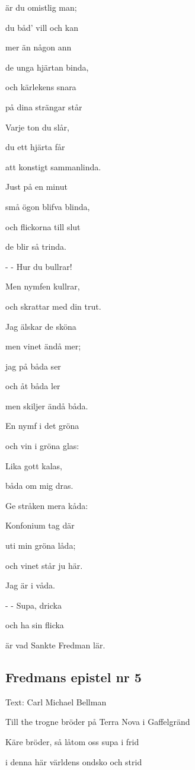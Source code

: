 är du omistlig man;

du båd’ vill och kan

mer än någon ann

de unga hjärtan binda,

och kärlekens snara

på dina strängar står

Varje ton du slår,

du ett hjärta får

att konstigt sammanlinda.

Just på en minut

små ögon blifva blinda,

och flickorna till slut

de blir så trinda.

- - Hur du bullrar!

Men nymfen kullrar,

och skrattar med din trut. \bigskip

Jag älskar de sköna

men vinet ändå mer;

jag på båda ser

och åt båda ler

men skiljer ändå båda.

En nymf i det gröna

och vin i gröna glas:

Lika gott kalas,

båda om mig dras.

Ge stråken mera kåda:

Konfonium tag där

uti min gröna låda;

och vinet står ju här.

Jag är i våda.

- - Supa, dricka

och ha sin flicka

är vad Sankte Fredman lär. \bigskip

\subsection{\textbf{Fredmans epistel nr 5}}

Text: Carl Michael Bellman

Till the trogne bröder på Terra Nova i Gaffelgränd\bigskip

Käre bröder, så låtom oss supa i frid

i denna här världens ondsko och strid

